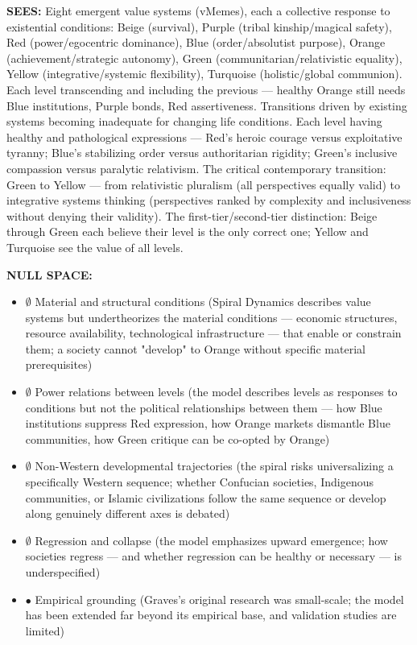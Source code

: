 \textbf{SEES:} Eight emergent value systems (vMemes), each a collective response to existential conditions: Beige (survival), Purple (tribal kinship/\allowbreak magical safety), Red (power/\allowbreak egocentric dominance), Blue (order/\allowbreak absolutist purpose), Orange (achievement/\allowbreak strategic autonomy), Green (communitarian/\allowbreak relativistic equality), Yellow (integrative/\allowbreak systemic flexibility), Turquoise (holistic/\allowbreak global communion). Each level transcending and including the previous — healthy Orange still needs Blue institutions, Purple bonds, Red assertiveness. Transitions driven by existing systems becoming inadequate for changing life conditions. Each level having healthy and pathological expressions — Red's heroic courage versus exploitative tyranny; Blue's stabilizing order versus authoritarian rigidity; Green's inclusive compassion versus paralytic relativism. The critical contemporary transition: Green to Yellow — from relativistic pluralism (all perspectives equally valid) to integrative systems thinking (perspectives ranked by complexity and inclusiveness without denying their validity). The first-tier/\allowbreak second-tier distinction: Beige through Green each believe their level is the only correct one; Yellow and Turquoise see the value of all levels.


\textbf{NULL SPACE:}

\begin{itemize}[nosep,leftmargin=*]
  \item $\emptyset$ Material and structural conditions (Spiral Dynamics describes value systems but undertheorizes the material conditions — economic structures, resource availability, technological infrastructure — that enable or constrain them; a society cannot "develop" to Orange without specific material prerequisites)
  \item $\emptyset$ Power relations between levels (the model describes levels as responses to conditions but not the political relationships between them — how Blue institutions suppress Red expression, how Orange markets dismantle Blue communities, how Green critique can be co-opted by Orange)
  \item $\emptyset$ Non-Western developmental trajectories (the spiral risks universalizing a specifically Western sequence; whether Confucian societies, Indigenous communities, or Islamic civilizations follow the same sequence or develop along genuinely different axes is debated)
  \item $\emptyset$ Regression and collapse (the model emphasizes upward emergence; how societies regress — and whether regression can be healthy or necessary — is underspecified)
  \item $\bullet$ Empirical grounding (Graves's original research was small-scale; the model has been extended far beyond its empirical base, and validation studies are limited)
\end{itemize}


